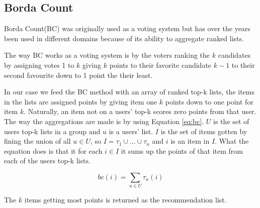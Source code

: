 \subsection{Borda Count}\label{sec:bordacount}
Borda Count(BC) was originally used as a voting system but has over the years been used in different domains because of its ability to aggregate ranked lists\cite{Baltrunas:2010:GRR:1864708.1864733, Masthoff2004}.

The way BC works as a voting system is by the voters ranking the $k$ candidates by assigning votes 1 to $k$ giving $k$ points to their favorite candidate $k-1$ to their second favourite down to 1 point the their least.

In our case we feed the BC method with an array of ranked top-k lists, the items in the lists are assigned points by giving item one $k$ points down to one point for item $k$\cite{ourreport}.  Naturally, an item not on a users' top-k scores zero points from that user. The way the aggregations are made is by using Equation \ref{eq:bc}. $U$ is the set of users top-k lists in a group and $u$ is a users' list. $I$ is the set of items gotten by fining the union of all $u\in U$, so $I = \tau_1 \cup ... \cup \tau_u$ and $i$ is an item in $I$. What the equation does is that it for each $i\in I$ it sums up the points of that item from each of the users top-k lists.


\begin{equation}\label{eq:bc}
bc(i) = \sum_{u\in U} \tau_u(i)
\end{equation}

The $k$ items getting most points is returned as the recommendation list.